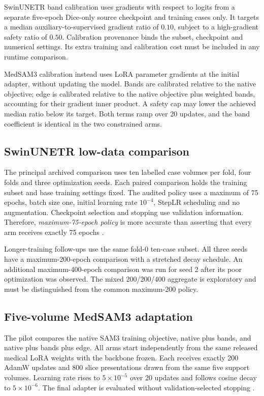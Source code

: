 SwinUNETR band calibration uses gradients with respect to logits from a separate five-epoch Dice-only source checkpoint and training cases only. It targets a median auxiliary-to-supervised gradient ratio of $0.10$, subject to a high-gradient safety ratio of $0.50$. Calibration provenance binds the subset, checkpoint and numerical settings. Its extra training and calibration cost must be included in any runtime comparison.

MedSAM3 calibration instead uses LoRA parameter gradients at the initial adapter, without updating the model. Bands are calibrated relative to the native objective; edge is calibrated relative to the native objective plus weighted bands, accounting for their gradient inner product. A safety cap may lower the achieved median ratio below its target. Both terms ramp over 20 updates, and the band coefficient is identical in the two constrained arms.

\subsection{SwinUNETR low-data comparison}
The principal archived comparison uses ten labelled case volumes per fold, four folds and three optimization seeds. Each paired comparison holds the training subset and base training settings fixed. The audited policy uses a maximum of 75 epochs, batch size one, initial learning rate $10^{-4}$, StepLR scheduling and no augmentation. Checkpoint selection and stopping use validation information. Therefore, \emph{maximum-75-epoch policy} is more accurate than asserting that every arm receives exactly 75 epochs \cite{localLowDataAudit}.

Longer-training follow-ups use the same fold-0 ten-case subset. All three seeds have a maximum-200-epoch comparison with a stretched decay schedule. An additional maximum-400-epoch comparison was run for seed 2 after its poor optimization was observed. The mixed 200/200/400 aggregate is exploratory and must be distinguished from the common maximum-200 policy.

\subsection{Five-volume MedSAM3 adaptation}
The pilot compares the native SAM3 training objective, native plus bands, and native plus bands plus edge. All arms start independently from the same released medical LoRA weights with the backbone frozen. Each receives exactly 200 AdamW updates and 800 slice presentations drawn from the same five support volumes. Learning rate rises to $5\times10^{-5}$ over 20 updates and follows cosine decay to $5\times10^{-6}$. The final adapter is evaluated without validation-selected stopping \cite{localMedSAMpilot}.

